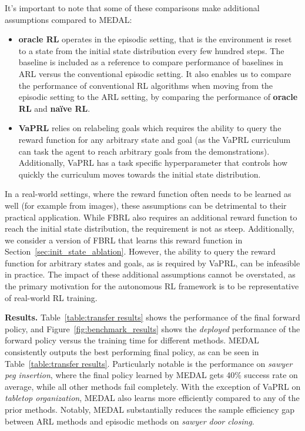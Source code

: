 \documentclass[nohyperref]{article}
\theoremstyle{plain}
\theoremstyle{definition}
\theoremstyle{remark}
\begin{document}
It's important to note that some of these comparisons make additional assumptions compared to MEDAL:
\begin{itemize}[noitemsep]
    \item \textbf{oracle RL} operates in the episodic setting, that is the environment is reset to a state from the initial state distribution every few hundred steps. The baseline is included as a reference to compare performance of baselines in ARL versus the conventional episodic setting. It also enables us to compare the performance of conventional RL algorithms when moving from the episodic setting to the ARL setting, by comparing the performance of \textbf{oracle RL} and \textbf{na\"ive RL}.
    \item \textbf{VaPRL} relies on relabeling goals which requires the ability to query the reward function for any arbitrary state and goal (as the VaPRL curriculum can task the agent to reach arbitrary goals from the demonstrations). Additionally, VaPRL has a task specific hyperparameter that controls how quickly the curriculum moves towards the initial state distribution.
\end{itemize}
In a real-world settings, where the reward function often needs to be learned as well (for example from images), these assumptions can be detrimental to their practical application. While FBRL also requires an additional reward function to reach the initial state distribution, the requirement is not as steep. Additionally, we consider a version of FBRL that learns this reward function in Section~\ref{sec:init_state_ablation}. However, the ability to query the reward function for arbitrary states and goals, as is required by VaPRL, can be infeasible in practice. The impact of these additional assumptions cannot be overstated, as the primary motivation for the autonomous RL framework is to be representative of real-world RL training.

\textbf{Results.}
Table~\ref{table:transfer results} shows the performance of the final forward policy, and Figure~\ref{fig:benchmark_results} shows the \textit{deployed} performance of the forward policy versus the training time for different methods.
MEDAL consistently outputs the best performing final policy, as can be seen in Table~\ref{table:transfer results}. Particularly notable is the performance on \textit{sawyer peg insertion}, where the final policy learned by MEDAL gets 40\% success rate on average, while all other methods fail completely. With the exception of VaPRL on \textit{tabletop organization}, MEDAL also learns more efficiently compared to any of the prior methods. Notably, MEDAL substantially reduces the sample efficiency gap between ARL methods and episodic methods on \textit{sawyer door closing}.
\end{document}
